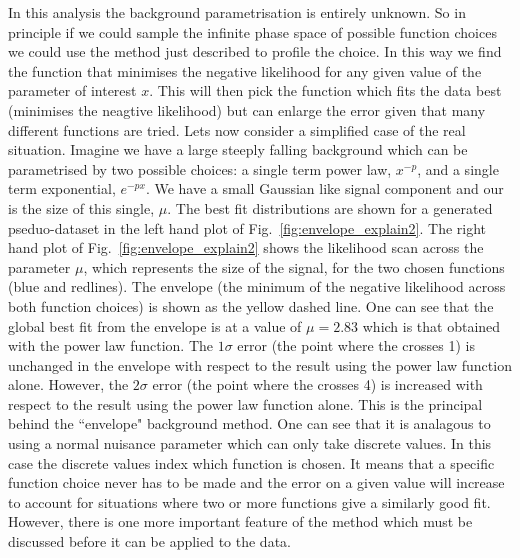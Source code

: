 In this analysis the background parametrisation is entirely unknown. So in principle if we could sample the infinite phase space of possible function choices we could use the method just described to profile the choice. In this way we find the function that minimises the negative likelihood for any given value of the parameter of interest $x$. This will then pick the function which fits the data best (minimises the neagtive likelihood) but can enlarge the error given that many different functions are tried.
Lets now consider a simplified case of the real situation. Imagine we have a large steeply falling background which can be parametrised by two possible choices: a single term power law, $x^{-p}$, and a single term exponential, $e^{-px}$. We have a small Gaussian like signal component and our \POI is the size of this single, $\mu$. The best fit distributions are shown for a generated pseduo-dataset in the left hand plot of Fig.~\ref{fig:envelope_explain2}. The right hand plot of Fig.~\ref{fig:envelope_explain2} shows the likelihood scan across the parameter $\mu$, which represents the size of the signal, for the two chosen functions (blue and redlines). The envelope (the minimum of the negative likelihood across both function choices) is shown as the yellow dashed line. One can see that the global best fit from the envelope is at a value of $\mu=2.83$ which is that obtained with the power law function. The $1\sigma$ error (the point where the \NLL crosses 1) is unchanged in the envelope with respect to the result using the power law function alone. However, the $2\sigma$ error (the point where the \NLL crosses 4) is increased with respect to the result using the power law function alone. This is the principal behind the ``envelope" background method. One can see that it is analagous to using a normal nuisance parameter which can only take discrete values. In this case the discrete values index which function is chosen. It means that a specific function choice never has to be made and the error on a given value will increase to account for situations where two or more functions give a similarly good fit. However, there is one more important feature of the method which must be discussed before it can be applied to the data.

